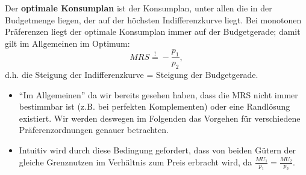 Der \textbf{optimale Konsumplan} ist der Konsumplan, unter allen die in der Budgetmenge liegen, der auf der höchsten Indifferenzkurve liegt. Bei monotonen Präferenzen liegt der optimale Konsumplan immer auf der Budgetgerade; damit gilt im Allgemeinen im Optimum:
		$$ MRS \overset{!}{=} - \frac{p_1}{p_2}, $$
d.h. die Steigung der Indifferenzkurve = Steigung der Budgetgerade.
\begin{itemize}
	\item \enquote{Im Allgemeinen} da wir bereits gesehen haben, dass die MRS nicht immer bestimmbar ist (z.B. bei perfekten Komplementen) oder eine Randlösung existiert. Wir werden deswegen im Folgenden das Vorgehen für verschiedene Präferenzordnungen genauer betrachten.
	\item Intuitiv wird durch diese Bedingung gefordert, dass von beiden Gütern der gleiche Grenznutzen im Verhältnis zum Preis erbracht wird, da $\frac{MU_1}{p_1} = \frac{MU_2}{p_2}$.
\end{itemize}

